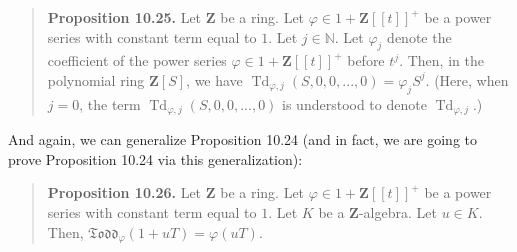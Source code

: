 \documentclass[numbers=enddot,12pt,final,onecolumn,notitlepage]{scrartcl}%
\begin{document}
\begin{quote}
\textbf{Proposition 10.25.} Let $\mathbf{Z}$ be a ring. Let $\varphi
\in1+\mathbf{Z}\left[  \left[  t\right]  \right]  ^{+}$ be a power series with
constant term equal to $1$. Let $j\in\mathbb{N}$. Let $\varphi_{j}$ denote the
coefficient of the power series $\varphi\in1+\mathbf{Z}\left[  \left[
t\right]  \right]  ^{+}$ before $t^{j}$. Then, in the polynomial ring
$\mathbf{Z}\left[  S\right]  $, we have $\operatorname*{Td}\nolimits_{\varphi
,j}\left(  S,0,0,...,0\right)  =\varphi_{j}S^{j}$. (Here, when $j=0$, the term
$\operatorname*{Td}\nolimits_{\varphi,j}\left(  S,0,0,...,0\right)  $ is
understood to denote $\operatorname*{Td}\nolimits_{\varphi,j}$.)
\end{quote}

And again, we can generalize Proposition 10.24 (and in fact, we are going to
prove Proposition 10.24 via this generalization):

\begin{quote}
\textbf{Proposition 10.26.} Let $\mathbf{Z}$ be a ring. Let $\varphi
\in1+\mathbf{Z}\left[  \left[  t\right]  \right]  ^{+}$ be a power series with
constant term equal to $1$. Let $K$ be a $\mathbf{Z}$-algebra. Let $u\in K$.
Then, $\mathfrak{Todd}_{\varphi}\left(  1+uT\right)  =\varphi\left(
uT\right)  $.
\end{quote}
\end{document}
